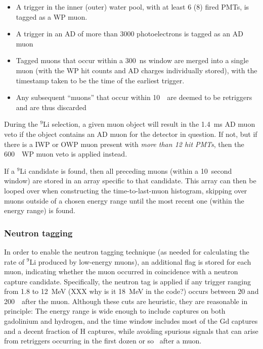 \documentclass[../thesis.tex]{subfiles}
\begin{document}
\begin{itemize}
\item A trigger in the inner (outer) water pool, with at least 6 (8) fired PMTs, is tagged as a WP muon.
\item A trigger in an AD of more than 3000 photoelectrons is tagged as an AD muon
\item Tagged muons that occur within a 300~ns window are merged into a single muon (with the WP hit counts and AD charges individually stored), with the timestamp taken to be the time of the earliest trigger.
\item Any subsequent ``muons'' that occur within 10~\us\ are deemed to be retriggers and are thus discarded
\end{itemize}

During the $^9$Li selection, a given muon object will result in the 1.4~ms AD muon veto if the object contains an AD muon for the detector in question. If not, but if there is a IWP or OWP muon present with \emph{more than 12 hit PMTs}, then the 600~\us\ WP muon veto is applied instead.

If a $^9$Li candidate is found, then all preceding muons (within a 10~second window) are stored in an array specific to that candidate. This array can then be looped over when constructing the time-to-last-muon histogram, skipping over muons outside of a chosen energy range until the most recent one (within the energy range) is found.

\subsubsection{Neutron tagging}
\label{sec:bkgLi9NeuTag}

In order to enable the neutron tagging technique (as needed for calculating the rate of $^9$Li produced by low-energy muons), an additional flag is stored for each muon, indicating whether the muon occurred in coincidence with a neutron capture candidate. Specifically, the neutron tag is applied if any trigger ranging from 1.8 to 12~MeV (XXX why is it 18~MeV in the code?) occurs between 20 and 200~\us\ after the muon. Although these cuts are heuristic, they are reasonable in principle: The energy range is wide enough to include captures on both gadolinium and hydrogen, and the time window includes most of the Gd captures and a decent fraction of H captures, while avoiding spurious signals that can arise from retriggers occurring in the first dozen or so \us\ after a muon.
\end{document}
